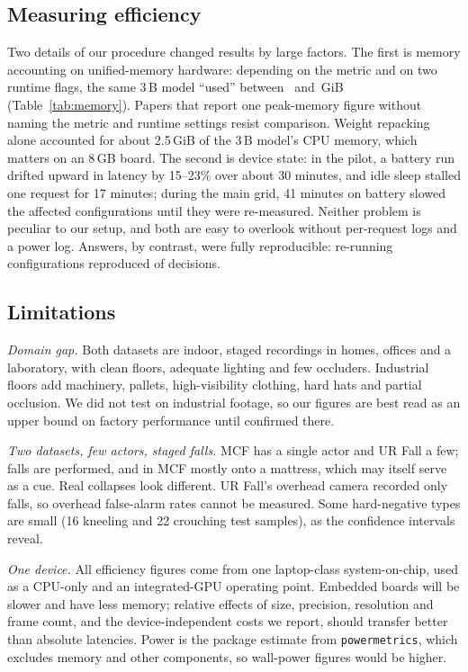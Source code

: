 \subsection{Measuring efficiency}
Two details of our procedure changed results by large factors. The first is memory accounting on unified-memory hardware: depending on the metric and on two runtime flags, the same 3\,B model ``used'' between \AblLargeGpuDefaultFpGiB\ and \AblLargeCpuDefaultRssGiB\,GiB (Table~\ref{tab:memory}). Papers that report one peak-memory figure without naming the metric and runtime settings resist comparison. Weight repacking alone accounted for about 2.5\,GiB of the 3\,B model's CPU memory, which matters on an 8\,GB board. The second is device state: in the pilot, a battery run drifted upward in latency by 15--23\% over about 30 minutes, and idle sleep stalled one request for 17 minutes; during the main grid, 41 minutes on battery slowed the affected configurations until they were re-measured. Neither problem is peculiar to our setup, and both are easy to overlook without per-request logs and a power log. Answers, by contrast, were fully reproducible: re-running \RRetimeConfigs{} configurations reproduced \RRetimeSame{} of \RRetimeTotal{} decisions.

\subsection{Limitations}
\label{sec:limitations}
\textit{Domain gap.} Both datasets are indoor, staged recordings in homes, offices and a laboratory, with clean floors, adequate lighting and few occluders. Industrial floors add machinery, pallets, high-visibility clothing, hard hats and partial occlusion. We did not test on industrial footage, so our figures are best read as an upper bound on factory performance until confirmed there.

\textit{Two datasets, few actors, staged falls.} MCF has a single actor and UR Fall a few; falls are performed, and in MCF mostly onto a mattress, which may itself serve as a cue. Real collapses look different. UR Fall's overhead camera recorded only falls, so overhead false-alarm rates cannot be measured. Some hard-negative types are small (16 kneeling and 22 crouching test samples), as the confidence intervals reveal.

\textit{One device.} All efficiency figures come from one laptop-class system-on-chip, used as a CPU-only and an integrated-GPU operating point. Embedded boards will be slower and have less memory; relative effects of size, precision, resolution and frame count, and the device-independent costs we report, should transfer better than absolute latencies. Power is the package estimate from \texttt{powermetrics}, which excludes memory and other components, so wall-power figures would be higher.

